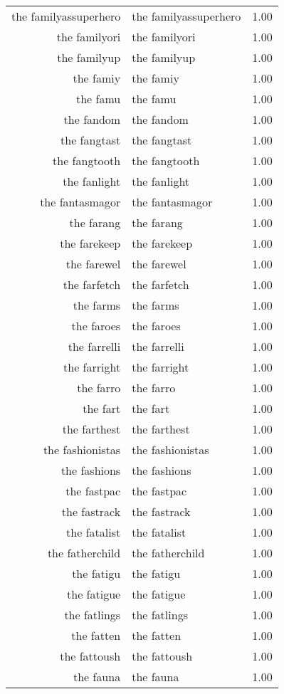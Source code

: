 \begin{table}[ht]
\begin{tabular}{rlr}
  the familyassuperhero & the familyassuperhero & 1.00 \\ 
  the familyori & the familyori & 1.00 \\ 
  the familyup & the familyup & 1.00 \\ 
  the famiy & the famiy & 1.00 \\ 
  the famu & the famu & 1.00 \\ 
  the fandom & the fandom & 1.00 \\ 
  the fangtast & the fangtast & 1.00 \\ 
  the fangtooth & the fangtooth & 1.00 \\ 
  the fanlight & the fanlight & 1.00 \\ 
  the fantasmagor & the fantasmagor & 1.00 \\ 
  the farang & the farang & 1.00 \\ 
  the farekeep & the farekeep & 1.00 \\ 
  the farewel & the farewel & 1.00 \\ 
  the farfetch & the farfetch & 1.00 \\ 
  the farms & the farms & 1.00 \\ 
  the faroes & the faroes & 1.00 \\ 
  the farrelli & the farrelli & 1.00 \\ 
  the farright & the farright & 1.00 \\ 
  the farro & the farro & 1.00 \\ 
  the fart & the fart & 1.00 \\ 
  the farthest & the farthest & 1.00 \\ 
  the fashionistas & the fashionistas & 1.00 \\ 
  the fashions & the fashions & 1.00 \\ 
  the fastpac & the fastpac & 1.00 \\ 
  the fastrack & the fastrack & 1.00 \\ 
  the fatalist & the fatalist & 1.00 \\ 
  the fatherchild & the fatherchild & 1.00 \\ 
  the fatigu & the fatigu & 1.00 \\ 
  the fatigue & the fatigue & 1.00 \\ 
  the fatlings & the fatlings & 1.00 \\ 
  the fatten & the fatten & 1.00 \\ 
  the fattoush & the fattoush & 1.00 \\ 
  the fauna & the fauna & 1.00 \\ 

\end{tabular}
\end{table}
